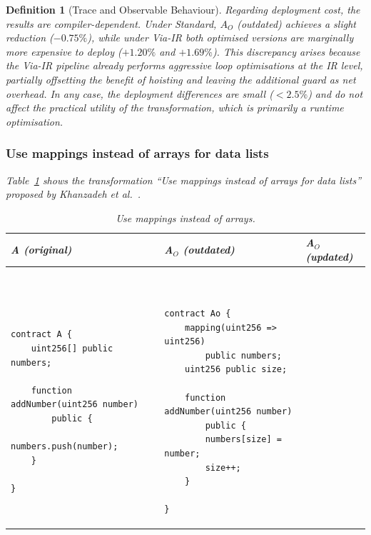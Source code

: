 \documentclass[manuscript,screen,review]{acmart}
\newtheorem{definition}{Definition}
\begin{document}
\begin{definition}[Trace and Observable Behaviour]
Regarding deployment cost, the results are compiler-dependent. Under Standard, $A_O$ (outdated) achieves a slight reduction ($-0.75\%$), while under Via-IR both optimised versions are marginally more expensive to deploy ($+1.20\%$ and $+1.69\%$). This discrepancy arises because the Via-IR pipeline already performs aggressive loop optimisations at the IR level, partially offsetting the benefit of hoisting and leaving the additional guard as net overhead. In any case, the deployment differences are small ($< 2.5\%$) and do not affect the practical utility of the transformation, which is primarily a runtime optimisation.

\subsubsection{Use mappings instead of arrays for data lists}
\label{sec:outdated_mappings}

Table~\ref{tab:mapping_arrays} shows the transformation ``Use mappings instead of arrays for data lists'' proposed by Khanzadeh {\em et al.\/}~\cite{khanzadeh2023optimizing}.

\begin{table}[htb]
\caption{Use mappings instead of arrays.}
\label{tab:mapping_arrays}
\centering
\begin{tabular}{|p{}|p{}|p{}|}
\hline
\rowcolor[HTML]{EFEFEF}
\textbf{A (original)} & \textbf{A$_O$ (outdated)} & \textbf{A$_O$ (updated)} \\ \hline
\vspace*{-0.5cm}
\begin{verbatim}


contract A {
    uint256[] public numbers;
    
    function addNumber(uint256 number) 
        public {
        numbers.push(number);
    }
    
}
\end{verbatim}
&
\vspace*{-0.5cm}
\begin{verbatim}


contract Ao {
    mapping(uint256 => uint256) 
        public numbers;
    uint256 public size;
    
    function addNumber(uint256 number) 
        public {
        numbers[size] = number;
        size++;
    }
    
}
\end{verbatim}
&
\vspace*{-0.5cm}
\begin{verbatim}



\end{verbatim}
\end{tabular}
\end{table}
\end{definition}
\end{document}
